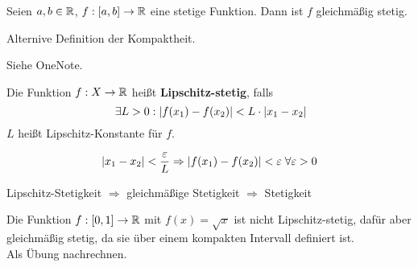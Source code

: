 \documentclass[main.tex]{subfiles}
\begin{document}
\begin{Theorem}
  Seien $a,b \in \mathbb{R}$, $f:[a,b]\to \mathbb{R}$ eine stetige Funktion. Dann ist $f$ gleichmäßig stetig.
\end{Theorem}

\begin{Bemerkung}
  Alternive Definition der Kompaktheit.
\end{Bemerkung}

\begin{Beweis}
  Siehe OneNote.
\end{Beweis}

\begin{Definition}
  Die Funktion $f: X\to \mathbb{R}$ heißt \textbf{Lipschitz-stetig}, falls
  $$\;\exists L > 0 : |f(x_1)-f(x_2)| < L \cdot |x_1 - x_2|$$
  $L$ heißt Lipschitz-Konstante für $f$.
  \begin{Bemerkung}
    $$|x_1 - x_2| < \dfrac{\varepsilon}{L} \Rightarrow |f(x_1)-f(x_2)| < \varepsilon \;\forall \varepsilon > 0$$
  \end{Bemerkung}
\end{Definition}

\begin{Theorem}
  Lipschitz-Stetigkeit $\Rightarrow$ gleichmäßige Stetigkeit $\Rightarrow$ Stetigkeit
\end{Theorem}

\begin{Beispiel}
  Die Funktion $f:[0,1] \to \mathbb{R}$ mit $f(x) = \sqrt{x}$ ist nicht Lipschitz-stetig, dafür aber gleichmäßig stetig, da sie über einem kompakten Intervall definiert ist.\\
  Als Übung nachrechnen.
\end{Beispiel}
\end{document}
